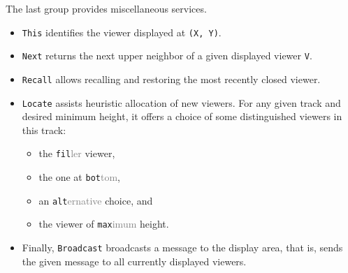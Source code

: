 The last group provides miscellaneous services.
\begin{itemize}
  \item \verb|This| identifies the viewer displayed at \verb|(X, Y)|.
  \item \verb|Next| returns the next upper neighbor of a given displayed viewer \verb|V|.
  \item \verb|Recall| allows recalling and restoring the most recently closed viewer.
  \item \verb|Locate| assists heuristic allocation of new viewers.
    For any given track and desired minimum height, it offers a choice
    of some distinguished viewers in this track:
    \begin{itemize}
      \item the \verb|fil|\textcolor{gray}{ler} viewer,
      \item the one at \verb|bot|\textcolor{gray}{tom},
      \item an \verb|alt|\textcolor{gray}{ernative} choice, and
      \item the viewer of \verb|max|\textcolor{gray}{imum} height.
    \end{itemize}
  \item Finally, \verb|Broadcast| broadcasts a message to the display area, that is,
    sends the given message to all currently displayed viewers.
\end{itemize}

